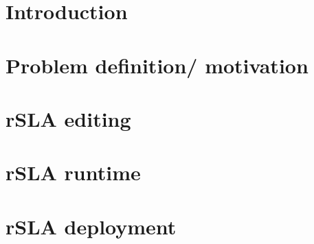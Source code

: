 \documentclass{llncs}
\begin{document}
\lstset{numbers=left, basicstyle=\small, numbersep=5pt, numberstyle=\tiny}

\section{Introduction}


\section{Problem definition/ motivation}


\section{rSLA editing }

\section{rSLA runtime }

\section{rSLA deployment }



\end{document}
